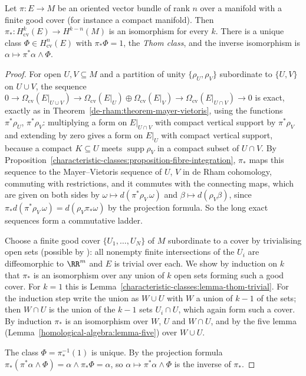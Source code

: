\begin{theorem}\label{characteristic-classes:theorem-thom-de-rham}
Let $\pi \colon E \to M$ be an oriented vector bundle of rank $n$ over a manifold with a finite good cover (for instance a compact manifold). Then $\pi_* \colon H^k_{\mathrm{cv}}(E) \to H^{k-n}(M)$ is an isomorphism for every $k$. There is a
unique class $\Phi \in H^n_{\mathrm{cv}}(E)$ with $\pi_*\Phi = 1$, the \emph{Thom class}, and the inverse isomorphism is $\alpha \mapsto \pi^*\alpha \wedge \Phi$.
\end{theorem}

\begin{proof}
For open $U, V \subseteq M$ and a partition of unity $\{\rho_U, \rho_V\}$ subordinate to $\{U, V\}$ on $U \cup V$, the sequence
$0 \to \Omega_{\mathrm{cv}}(E|_{U \cup V}) \to \Omega_{\mathrm{cv}}(E|_U) \oplus \Omega_{\mathrm{cv}}(E|_V) \to \Omega_{\mathrm{cv}}(E|_{U \cap V}) \to 0$ is exact, exactly as in Theorem~\ref{de-rham:theorem-mayer-vietoris}, using the functions
$\pi^*\rho_U$, $\pi^*\rho_V$: multiplying a form on $E|_{U \cap V}$ with compact vertical support by $\pi^*\rho_V$ and extending by zero gives a form on $E|_U$ with compact vertical support, because a compact $K \subseteq U$ meets
$\operatorname{supp}\rho_V$ in a compact subset of $U \cap V$. By Proposition~\ref{characteristic-classes:proposition-fibre-integration}, $\pi_*$ maps this sequence to the Mayer--Vietoris sequence of $U$, $V$ in de Rham
cohomology, commuting with restrictions, and it commutes with the connecting maps, which are given on both sides by $\omega \mapsto d(\pi^*\rho_V\,\omega)$ and $\beta \mapsto d(\rho_V\beta)$, since
$\pi_*d(\pi^*\rho_V\,\omega) = d(\rho_V\pi_*\omega)$ by the projection formula. So the long exact sequences form a commutative ladder.

Choose a finite good cover $\{U_1, \ldots, U_N\}$ of $M$ subordinate to a cover by trivialising open sets (possible by \cite[Chapter I, Section 5]{bott-tu}): all nonempty finite intersections of the $U_i$ are diffeomorphic to $\RR^m$ and
$E$ is trivial over each. We show by induction on $k$ that $\pi_*$ is an isomorphism over any union of $k$ open sets forming such a good cover. For $k = 1$ this is Lemma~\ref{characteristic-classes:lemma-thom-trivial}. For the
induction step write the union as $W \cup U$ with $W$ a union of $k - 1$ of the sets; then $W \cap U$ is the union of the $k - 1$ sets $U_i \cap U$, which again form such a cover. By induction $\pi_*$ is an isomorphism over $W$, $U$ and
$W \cap U$, and by the five lemma (Lemma~\ref{homological-algebra:lemma-five}) over $W \cup U$.

The class $\Phi = \pi_*^{-1}(1)$ is unique. By the projection formula $\pi_*(\pi^*\alpha \wedge \Phi) = \alpha \wedge \pi_*\Phi = \alpha$, so $\alpha \mapsto \pi^*\alpha \wedge \Phi$ is the inverse of $\pi_*$.
\end{proof}

